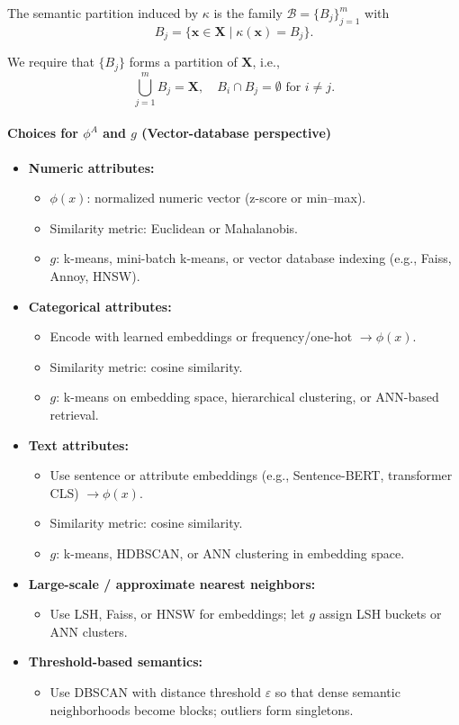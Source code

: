 \documentclass[10pt,a4paper]{scrartcl}
\theoremstyle{definition}
\theoremstyle{remark}
\begin{document}
The semantic partition induced by $\kappa$ is the family $\mathcal{B} = \{B_j\}_{j=1}^m$ with
\[
B_j = \{\mathbf{x} \in \mathbf{X} \mid \kappa(\mathbf{x}) = B_j \}.
\]

We require that $\{B_j\}$ forms a partition of $\mathbf{X}$, i.e.,
\[
\bigcup_{j=1}^{m} B_j = \mathbf{X}, \quad B_i \cap B_j = \emptyset \text{ for } i \neq j.
\]

\color{red}
\paragraph{Choices for $\phi^A$ and $g$ (Vector-database perspective)}

\begin{itemize}
    \item \textbf{Numeric attributes:} 
        \begin{itemize}
            \item $\phi(x)$: normalized numeric vector (z-score or min--max). 
            \item Similarity metric: Euclidean or Mahalanobis. 
            \item $g$: k-means, mini-batch k-means, or vector database indexing (e.g., Faiss, Annoy, HNSW).
        \end{itemize}
    \item \textbf{Categorical attributes:} 
        \begin{itemize}
            \item Encode with learned embeddings or frequency/one-hot $\to \phi(x)$.
            \item Similarity metric: cosine similarity.
            \item $g$: k-means on embedding space, hierarchical clustering, or ANN-based retrieval.
        \end{itemize}
    \item \textbf{Text attributes:} 
        \begin{itemize}
            \item Use sentence or attribute embeddings (e.g., Sentence-BERT, transformer CLS) $\to \phi(x)$.
            \item Similarity metric: cosine similarity.
            \item $g$: k-means, HDBSCAN, or ANN clustering in embedding space.
        \end{itemize}
    \item \textbf{Large-scale / approximate nearest neighbors:} 
        \begin{itemize}
            \item Use LSH, Faiss, or HNSW for embeddings; let $g$ assign LSH buckets or ANN clusters.
        \end{itemize}
    \item \textbf{Threshold-based semantics:} 
        \begin{itemize}
            \item Use DBSCAN with distance threshold $\varepsilon$ so that dense semantic neighborhoods become blocks; outliers form singletons.
        \end{itemize}
\end{itemize}
\color{black}
\end{document}
